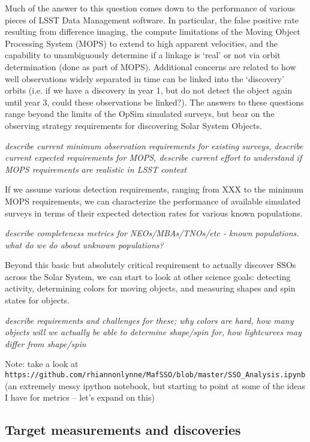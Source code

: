 Much of the answer to this question comes down to the performance of
various pieces of LSST Data Management software. In particular, the
false positive rate resulting from difference imaging, the compute
limitations of the Moving Object Processing System (MOPS) to extend to high
apparent velocities, and the capability to unambiguously determine if
a linkage is `real' or not via orbit determination (done as part of
MOPS). Additional concerns are related to how well observations
widely separated in time can be linked into the `discovery' orbits
(i.e. if we have a discovery in year 1, but do not detect the object
again until year 3, could these observations be linked?). The answers
to these questions range beyond the limits of the OpSim simulated
surveys, but bear on the observing strategy requirements for
discovering Solar System Objects.

{\it describe current minimum observation requirements for existing
  surveys, describe current expected requirements for MOPS, describe
  current effort to understand if MOPS requirements are realistic in
  LSST context}

If we assume various detection requirements, ranging from XXX to the
minimum MOPS requirements, we can characterize the performance of
available simulated surveys in terms of their expected detection rates
for various known populations.

{\it describe completeness metrics for NEOs/MBAs/TNOs/etc - known
  populations. what do we do about unknown populations?}

Beyond this basic but absolutely critical requirement to actually
discover SSOs across the Solar System, we can start to look at other
science goals: detecting activity, determining colors for moving
objects, and measuring shapes and spin states for objects.

{\it describe requirements and challenges for these; why colors are
  hard, how many objects will we actually be able to determine
  shape/spin for, how lightcurves may differ from shape/spin}

Note: take a look at
\texttt{https://github.com/rhiannonlynne/MafSSO/blob/master/SSO\_Analysis.ipynb}
(an extremely messy ipython notebook, but starting to point at some of
the ideas I have for metrics -- let's expand on this)



\subsection{Target measurements and discoveries}
\label{sec:\secname:targets}

